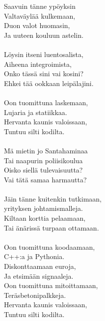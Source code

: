 
Saavuin tänne ypöyksin \\ Valtaväylää kulkemaan, \\ Duon valot huomasin, \\ Ja uuteen kouluun astelin. \\ \hspace{10mm} \\ Löysin itseni luentosalista, \\ Aiheena integroimista, \\ Onko tässä sini vai kosini? \\ Ehkei tää ookkaan leipälajini. \\ \hspace{10mm} \\ Oon tuomittuna laskemaan, \\ Lujaria ja statiikkaa. \\ Hervanta kaunis valoissaan, \\ Tuntuu silti kodilta. \\ \hspace{10mm} \\ Mä mietin jo Santahaminaa \\ Tai naapurin poliisikoulua \\ Oisko siellä tulevaisuutta? \\ Vai tätä samaa harmautta? \\ \hspace{10mm} \\ Jäin tänne kuitenkin tutkimaan, \\ yrityksen johtamismalleja. \\ Kiltaan korttia pelaamaan, \\ Tai änärissä turpaan ottamaan. \\ \hspace{10mm} \\ Oon tuomittuna koodaamaan, \\ C++:a ja Pythonia. \\ Diskonttaamaan euroja, \\ Ja etsimään signaaleja. \\ Oon tuomittuna mitoittamaan, \\ Teräsbetonipalkkeja. \\ Hervanta kaunis valoissaan, \\ Tuntuu silti kodilta.